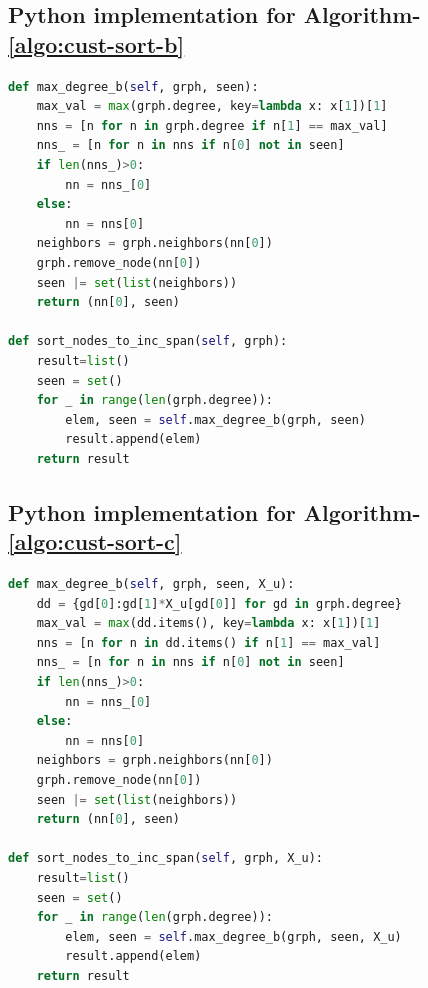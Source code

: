 \documentclass[11pt]{article}
\begin{document}
\subsection{Python implementation for Algorithm-\ref{algo:cust-sort-b} \label{s:algo-impl-b}}
\begin{lstlisting}[language=Python]
def max_degree_b(self, grph, seen):
    max_val = max(grph.degree, key=lambda x: x[1])[1]
    nns = [n for n in grph.degree if n[1] == max_val]
    nns_ = [n for n in nns if n[0] not in seen]
    if len(nns_)>0:
        nn = nns_[0]
    else:
        nn = nns[0]
    neighbors = grph.neighbors(nn[0])
    grph.remove_node(nn[0])
    seen |= set(list(neighbors))
    return (nn[0], seen)

def sort_nodes_to_inc_span(self, grph):
    result=list()
    seen = set()
    for _ in range(len(grph.degree)):
        elem, seen = self.max_degree_b(grph, seen)
        result.append(elem)
    return result
\end{lstlisting}

\subsection{Python implementation for Algorithm-\ref{algo:cust-sort-c} \label{s:algo-impl-c}}
\begin{lstlisting}[language=Python]
def max_degree_b(self, grph, seen, X_u):
    dd = {gd[0]:gd[1]*X_u[gd[0]] for gd in grph.degree}
    max_val = max(dd.items(), key=lambda x: x[1])[1]
    nns = [n for n in dd.items() if n[1] == max_val]
    nns_ = [n for n in nns if n[0] not in seen]
    if len(nns_)>0:
        nn = nns_[0]
    else:
        nn = nns[0]
    neighbors = grph.neighbors(nn[0])
    grph.remove_node(nn[0])
    seen |= set(list(neighbors))
    return (nn[0], seen)

def sort_nodes_to_inc_span(self, grph, X_u):
    result=list()
    seen = set()
    for _ in range(len(grph.degree)):
        elem, seen = self.max_degree_b(grph, seen, X_u)
        result.append(elem)
    return result
\end{lstlisting}


\newpage



\end{document}
